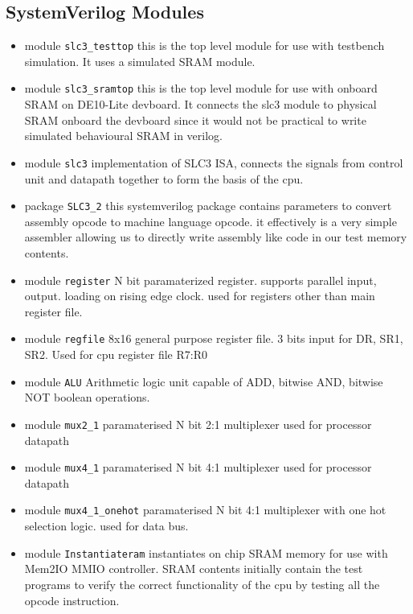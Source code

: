 \documentclass[a4paper,12pt]{report}
\begin{document}
\subsection{SystemVerilog Modules}  
\begin{itemize}
    \item module \verb*|slc3_testtop|
    \subitem this is the top level module for use with testbench simulation. It uses a simulated SRAM module. 
    \item module \verb*|slc3_sramtop| 
    \subitem this is the top level module for use with onboard SRAM on DE10-Lite devboard. It connects the slc3 module to physical SRAM onboard the devboard since it would not be practical to write simulated behavioural SRAM in verilog. 
    \item module \verb*|slc3|
    \subitem implementation of SLC3 ISA, connects the signals from control unit and datapath together to form the basis of the cpu. 
    \item package \verb*|SLC3_2|
    \subitem this systemverilog package contains parameters to convert assembly opcode to machine language opcode. it effectively is a very simple assembler allowing us to directly write assembly like code in our test memory contents. 
    \item module \verb*|register|
    \subitem N bit paramaterized register. supports parallel input, output. loading on rising edge clock. used for registers other than main register file. 
    \item module \verb*|regfile|
    \subitem 8x16 general purpose register file. 3 bits input for DR, SR1, SR2. Used for cpu register file R7:R0
    \item module \verb*|ALU| 
    \subitem Arithmetic logic unit capable of ADD, bitwise AND, bitwise NOT boolean operations. 
    \item module \verb*|mux2_1|
    \subitem paramaterised N bit 2:1 multiplexer used for processor datapath 
    \item module \verb*|mux4_1|
    \subitem paramaterised N bit 4:1 multiplexer used for processor datapath 
    \item module \verb*|mux4_1_onehot|
    \subitem paramaterised N bit 4:1 multiplexer with one hot selection logic. used for data bus. 
    \item module \verb*|Instantiateram|
    \subitem  instantiates on chip SRAM memory for use with Mem2IO MMIO controller. SRAM contents initially contain the test programs to verify the correct functionality of the cpu by testing all the opcode instruction. 

\end{itemize}
\end{document}
